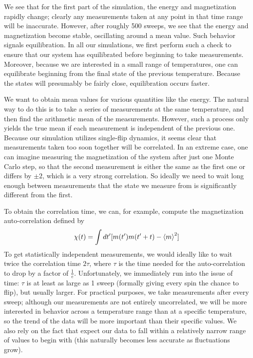 \documentclass[twocolumn,aps,prl]{revtex4-1} %
\begin{document}
We see that for the first part of the simulation, the energy and magnetization rapidly change; clearly any measurements taken at any point in that time range will be inaccurate. However, after roughly 500 sweeps, we see that the energy and magnetization become stable, oscillating around a mean value. Such behavior signals equilibration. In all our simulations, we first perform such a check to ensure that our system has equilibrated before beginning to take measurements. Moreover, because we are interested in a small range of temperatures, one can equilibrate beginning from the final state of the previous temperature. Because the states will presumably be fairly close, equilibration occurs faster.

We want to obtain mean values for various quantities like the energy. The natural way to do this is to take a series of measurements at the same temperature, and then find the arithmetic mean of the measurements. However, such a process only yields the true mean if each measurement is independent of the previous one. Because our simulation utilizes single-flip dynamics, it seems clear that measurements taken too soon together will be correlated. In an extreme case, one can imagine measuring the magnetization of the system after just one Monte Carlo step, so that the second measurement is either the same as the first one or differs by $\pm 2$, which is a very strong correlation. So ideally we need to wait long enough between measurements that the state we measure from is significantly different from the first.

To obtain the correlation time, we can, for example, compute the magnetization auto-correlation defined by
\begin{align}
\chi(t) = \int dt'[m(t')m(t'+t)-\braket{m}^2]
\end{align}
To get statistically independent measurements, we would ideally like to wait twice the correlation time $2\tau$, where $\tau$ is the time needed for the auto-correlation to drop by a factor of $\frac{1}{e}$. Unfortunately, we immediately run into the issue of time: $\tau$ is at least as large as 1 sweep (formally giving every spin the chance to flip), but usually larger. For practical purposes, we take measurements after every sweep; although our measurements are not entirely uncorrelated, we will be more interested in behavior across a temperature range than at a specific temperature, so the trend of the data will be more important than their specific values. We also rely on the fact that expect our data to fall within a relatively narrow range of values to begin with (this naturally becomes less accurate as fluctuations grow).
\end{document}
